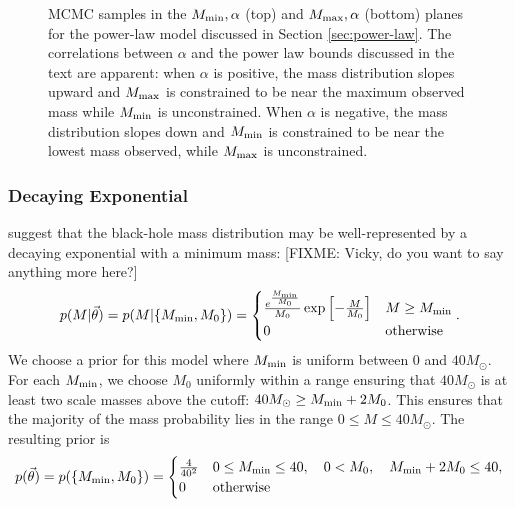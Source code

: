 \documentclass[preprint]{aastex}
\newcommand{\fixme}[1]{[FIXME: #1]}
\newcommand{\Msun}{M_\odot}
\newcommand{\Mmin}{M_{\textnormal{min}}}
\newcommand{\Mmax}{M_{\textnormal{max}}}
\newcommand{\vtheta}{\vec{\theta}}
\begin{document}
\begin{figure}
  \begin{center}
  \end{center}
  \caption{\label{fig:power-law-2D} MCMC samples in the $\Mmin,
    \alpha$ (top) and $\Mmax, \alpha$ (bottom) planes for the
    power-law model discussed in Section \ref{sec:power-law}.  The
    correlations between $\alpha$ and the power law bounds discussed
    in the text are apparent: when $\alpha$ is positive, the mass
    distribution slopes upward and $\Mmax$ is constrained to be near
    the maximum observed mass while $\Mmin$ is unconstrained.  When
    $\alpha$ is negative, the mass distribution slopes down and
    $\Mmin$ is constrained to be near the lowest mass observed, while
    $\Mmax$ is unconstrained. }
\end{figure}

\subsubsection{Decaying Exponential}
\label{sec:exponential}

\citet{Fryer2001} suggest that the black-hole mass distribution may be
well-represented by a decaying exponential with a minimum mass:
\fixme{Vicky, do you want to say anything more here?}
\begin{equation}
  \label{eq:exp-def}
  p(M|\vtheta) = p(M|\{\Mmin, M_0\}) = 
  \begin{cases}
    \frac{e^{\frac{\Mmin}{M_0}}}{M_0} \exp \left[ - \frac{M}{M_0}
    \right] & M \geq \Mmin \\
    0 & \textnormal{otherwise}
  \end{cases}.
\end{equation}
We choose a prior for this model where $\Mmin$ is uniform between 0
and $40 \Msun$.  For each $\Mmin$, we choose $M_0$ uniformly within a
range ensuring that $40\Msun$ is at least two scale masses above the
cutoff: $40\Msun \geq \Mmin + 2 M_0$.  This ensures that the majority
of the mass probability lies in the range $0 \leq M \leq 40\Msun$.
The resulting prior is
\begin{equation}
  p(\vtheta) = p(\{\Mmin, M_0\}) = 
  \begin{cases}
    \frac{4}{40^2} & 0 \leq \Mmin \leq 40, \quad 0 < M_0, \quad \Mmin
    + 2 M_0 \leq 40, \\
    0 & \textnormal{otherwise}
  \end{cases}
\end{equation}
\end{document}
